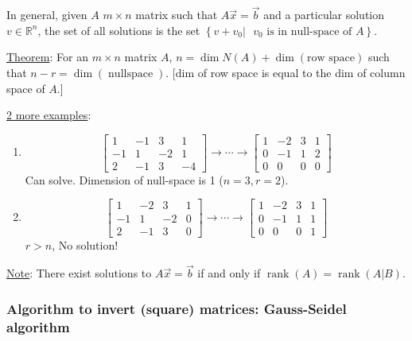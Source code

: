 \documentclass{article}
\newcommand{\tmop}[1]{\ensuremath{\operatorname{#1}}}
\begin{document}
In general, given $A$ $m \times n$ matrix such that $A \vec{x} = \vec{b}$ and
a particular solution $v \in \mathbb{R}^n$, the set of all solutions is the
set $\left\{ v + v_0 | \text{ $v_0 \text{ is in null-space of $A$}$}
\right\}$.

{\underline{Theorem}}: For an $m \times n$ matrix $A$, $n = \dim N (A) + \dim
\left( \text{row space} \right)$ such that $n - r = \dim (\tmop{nullspace})$.
[dim of row space is equal to the dim of column space of $A$.]

{\underline{2 more examples}}:
\begin{enumerate}
  \item
  \[ \left[\begin{array}{ccc|c}
       1 & - 1 & 3 & 1\\
       - 1 & 1 & - 2 & 1\\
       2 & - 1 & 3 & - 4
     \end{array}\right] \rightarrow \cdots \rightarrow
     \left[\begin{array}{ccc|c}
       1 & - 2 & 3 & 1\\
       0 & - 1 & 1 & 2\\
       0 & 0 & 0 & 0
     \end{array}\right] \]
  Can solve. Dimension of null-space is 1 ($n = 3, r = 2$).
  
  \item
  \[ \left[\begin{array}{ccc|c}
       1 & - 2 & 3 & 1\\
       - 1 & 1 & - 2 & 0\\
       2 & - 1 & 3 & 0
     \end{array}\right] \rightarrow \cdots \rightarrow
     \left[\begin{array}{ccc|c}
       1 & - 2 & 3 & 1\\
       0 & - 1 & 1 & 1\\
       0 & 0 & 0 & 1
     \end{array}\right] \]
  $r > n$, No solution!
\end{enumerate}
{\underline{Note}}: There exist solutions to $A \vec{x} = \vec{b}$ if and only
if $\tmop{rank} (A) = \tmop{rank} (A|B)$.

{\newpage}

\subsubsection{Algorithm to invert (square) matrices: Gauss-Seidel algorithm}
\end{document}
